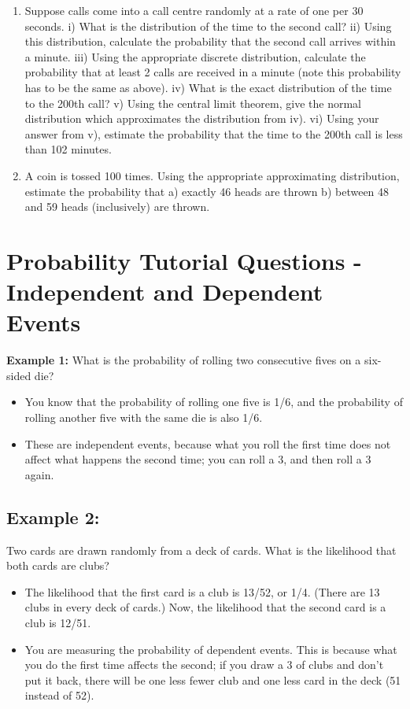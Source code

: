 \documentclass[]{report}
\begin{document}
\begin{enumerate}
	
	
\item  Suppose calls come into a call centre randomly at a rate of one per 30 seconds.
	i) What is the distribution of the time to the second call?
	ii) Using this distribution, calculate the probability that the second call arrives within a minute. 
	iii) Using the appropriate discrete distribution, calculate the probability that at least 2 calls are received in a minute (note this probability has to be the same as above).
	iv) What is the exact distribution of the time to the 200th call?
	v) Using the central limit theorem, give the normal distribution which approximates the distribution from iv).
	vi) Using your answer from v), estimate the probability that the time to the 200th call is less than 102 minutes.
	
\item A coin is tossed 100 times. Using the appropriate approximating distribution, estimate the probability that
	a) exactly 46 heads are thrown
	b) between 48 and 59 heads (inclusively) are thrown.

\end{enumerate}	
\newpage


\section{Probability Tutorial Questions -Independent and Dependent Events}

\textbf{Example 1:} What is the probability of rolling two consecutive fives on a six-sided die?
\begin{itemize}
	\item You know that the probability of rolling one five is 1/6, and the probability of rolling another five with the same die is also 1/6.
	\item These are independent events, because what you roll the first time does not affect what happens the second time; you can roll a 3, and then roll a 3 again.
\end{itemize}


\subsection{Example 2:} Two cards are drawn randomly from a deck of cards. What is the likelihood that both cards are clubs?
\begin{itemize}
	\item The likelihood that the first card is a club is 13/52, or 1/4. (There are 13 clubs in every deck of cards.) Now, the likelihood that the second card is a club is 12/51.
	\item You are measuring the probability of dependent events. This is because what you do the first time affects the second; if you draw a 3 of clubs and don't put it back, there will be one less fewer club and one less card in the deck (51 instead of 52).
\end{itemize}
\end{document}
